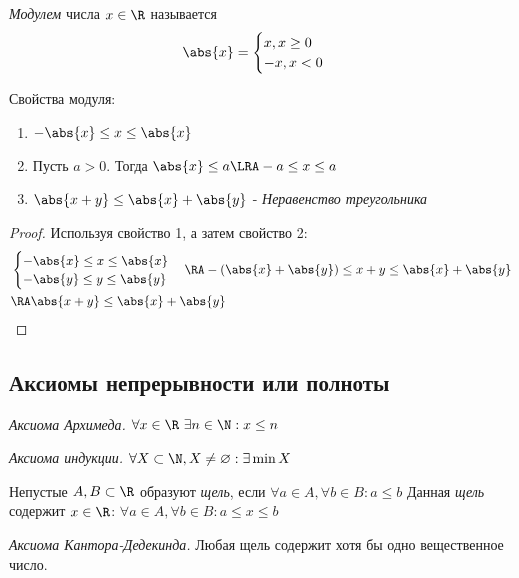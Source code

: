 \documentclass[a4paper, 14pt]{article}
\begin{document}
    \begin{definition}
        {\it Модулем} числа $x \in \R$ называется
        \[\abs{x} = 
        \begin{cases}
            x, x \geq 0 \\ -x, x < 0    
        \end{cases}\]
    \end{definition}
    Свойства модуля:
    \begin{enumerate}
        \item $-\abs{x} \leq x \leq \abs{x}$
        \item Пусть $a > 0$. Тогда $\abs{x} \leq a \LRA -a \leq x \leq a$
        \item $\abs{x+y} \leq \abs{x} + \abs{y}$ - {\it Неравенство треугольника}
    \end{enumerate}
    \begin{proof}
        Используя свойство 1, а затем свойство 2:
        \begin{align*}
            &\begin{cases}
                -\abs{x} \leq x \leq \abs{x} \\
                -\abs{y} \leq y \leq \abs{y}
            \end{cases} \RA 
            - (\abs{x} + \abs{y}) \leq x + y \leq \abs{x} + \abs{y}  \\
            &\RA \abs{x+y} \leq \abs{x} + \abs{y}
        \end{align*}
    \end{proof}

    \subsection{Аксиомы непрерывности или полноты}

    {\it Аксиома Архимеда.} $\forall x \in \R \ \exists n \in \N : x \leq n$ 

    {\it Аксиома индукции.} $\forall X \subset \N, X \neq \varnothing : \exists \min X$

    \begin{definition}
        Непустые $A, B \subset \R$ образуют {\it щель}, если $\forall a \in A, \forall b \in B : a \leq b$
        Данная {\it щель} содержит $x \in \R$: $\forall a \in A, \forall b \in B: a \leq x \leq b$
    \end{definition}

    {\it Аксиома Кантора-Дедекинда.} Любая щель содержит хотя бы одно вещественное число.
\end{document}
